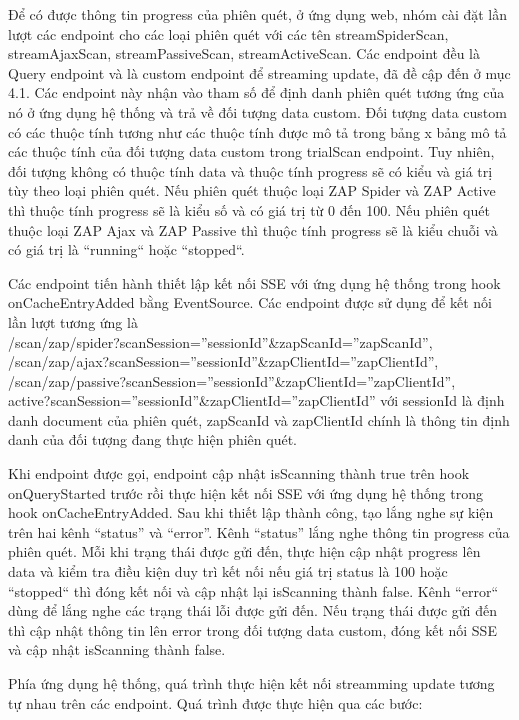 Để có được thông tin progress của phiên quét, ở ứng dụng web, nhóm cài đặt lần lượt các endpoint cho các loại phiên quét với các tên streamSpiderScan, streamAjaxScan, streamPassiveScan, streamActiveScan. Các endpoint đều là Query endpoint và là custom endpoint để streaming update, đã đề cập đến ở mục 4.1. Các endpoint này nhận vào tham số để định danh phiên quét tương ứng của nó ở ứng dụng hệ thống và trả về đối tượng data custom. Đối tượng data custom có các thuộc tính tương như các thuộc tính được mô tả trong bảng x bảng mô tả các thuộc tính của đối tượng data custom trong trialScan endpoint. Tuy nhiên, đối tượng không có thuộc tính data và thuộc tính progress sẽ có kiểu và giá trị tùy theo loại phiên quét. Nếu phiên quét thuộc loại ZAP Spider và ZAP Active thì thuộc tính progress sẽ là kiểu số và có giá trị từ 0 đến 100. Nếu phiên quét thuộc loại ZAP Ajax và ZAP Passive thì thuộc tính progress sẽ là kiểu chuỗi và có giá trị là “running“ hoặc “stopped“.

Các endpoint tiến hành thiết lập kết nối SSE với ứng dụng hệ thống trong hook onCacheEntryAdded bằng EventSource. Các endpoint được sử dụng để kết nối lần lượt tương ứng là \\
/scan/zap/spider?scanSession=”sessionId”\&zapScanId=”zapScanId”, \\
/scan/zap/ajax?scanSession=”sessionId”\&zapClientId=”zapClientId”, \\
/scan/zap/passive?scanSession=”sessionId”\&zapClientId=”zapClientId”, \\
active?scanSession=”sessionId”\&zapClientId=”zapClientId” với sessionId là định danh document của phiên quét, zapScanId và zapClientId chính là thông tin định danh của đối tượng đang thực hiện phiên quét.

Khi endpoint được gọi, endpoint cập nhật isScanning thành true trên hook onQueryStarted trước rồi thực hiện kết nối SSE với ứng dụng hệ thống trong hook onCacheEntryAdded. Sau khi thiết lập thành công, tạo lắng nghe sự kiện trên hai kênh “status” và “error”. Kênh “status” lắng nghe thông tin progress của phiên quét. Mỗi khi trạng thái được gửi đến, thực hiện cập nhật progress lên data và kiểm tra điều kiện duy trì kết nối nếu giá trị status là 100 hoặc “stopped“ thì đóng kết nối và cập nhật lại isScanning thành false. Kênh “error“ dùng để lắng nghe các trạng thái lỗi được gửi đến. Nếu trạng thái được gửi đến thì cập nhật thông tin lên error trong đối tượng data custom, đóng kết nối SSE và cập nhật isScanning thành false.

Phía ứng dụng hệ thống, quá trình thực hiện kết nối streamming update tương tự nhau trên các endpoint. Quá trình được thực hiện qua các bước:

